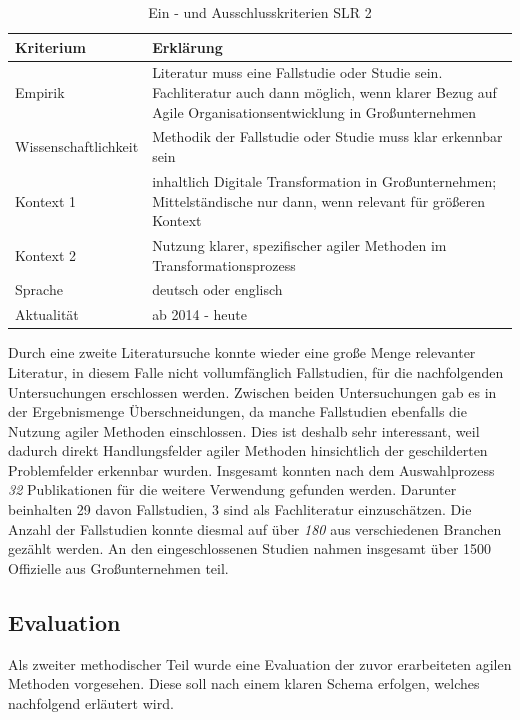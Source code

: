 \begin{table}[ht]
	\centering
	\caption{Ein - und Ausschlusskriterien SLR 2}
	\begin{tabular}{|p{4cm}|p{8cm}|}
		\hline
		\textbf{Kriterium}& \textbf{Erklärung}  \\
		\hline
		Empirik & Literatur muss eine Fallstudie oder Studie sein. Fachliteratur auch dann möglich, wenn klarer Bezug auf Agile Organisationsentwicklung in Großunternehmen \\
		Wissenschaftlichkeit & Methodik der  Fallstudie oder Studie muss klar erkennbar sein \\
		Kontext 1 & inhaltlich Digitale Transformation in Großunternehmen; Mittelständische nur dann, wenn relevant für größeren Kontext \\
		Kontext 2 & Nutzung klarer, spezifischer agiler Methoden im Transformationsprozess \\
		Sprache & deutsch oder englisch \\
		Aktualität & ab 2014 - heute  \\
		\hline
	\end{tabular}
	\label{tab:criteriaslr2}
\end{table}

Durch eine zweite Literatursuche konnte wieder eine große Menge relevanter Literatur, in diesem Falle nicht vollumfänglich Fallstudien, für die nachfolgenden Untersuchungen erschlossen werden. Zwischen beiden Untersuchungen gab es in der Ergebnismenge Überschneidungen, da manche Fallstudien ebenfalls die Nutzung agiler Methoden einschlossen. Dies ist deshalb sehr interessant, weil dadurch direkt Handlungsfelder agiler Methoden hinsichtlich der geschilderten Problemfelder erkennbar wurden. Insgesamt konnten nach dem Auswahlprozess \textit{32} Publikationen für die weitere Verwendung gefunden werden. Darunter beinhalten 29 davon Fallstudien, 3 sind als Fachliteratur einzuschätzen. Die Anzahl der Fallstudien konnte diesmal auf über \textit{180} aus verschiedenen Branchen gezählt werden. An den eingeschlossenen Studien nahmen insgesamt über 1500 Offizielle aus Großunternehmen teil. 

\subsection{Evaluation}
\label{agilepractices:evaluationschema}

Als zweiter methodischer Teil wurde eine Evaluation der zuvor erarbeiteten agilen Methoden vorgesehen. Diese soll nach einem klaren Schema erfolgen, welches nachfolgend erläutert wird. 

